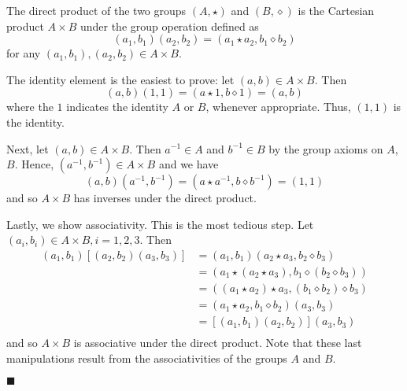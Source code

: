 \documentclass[12pt]{article}
\renewcommand{\qed}{\hfill$\blacksquare$}
\renewenvironment{proof}{\begin{addmargin}[1em]{0em}\begin{newproof}}{\end{newproof}\end{addmargin}\qed}
\begin{document}
\begin{proof}
The direct product of the two groups $\left(A,\star\right)$ and $\left(B,\diamond \right)$ is the Cartesian product $A\times B$ under the group operation defined as
$$\left(a_1,b_1\right)\left(a_2,b_2\right) = \left(a_1\star a_2, b_1\diamond b_2\right) $$
for any $\left(a_1,b_1\right),\left(a_2,b_2\right)\in A\times B$.

The identity element is the easiest to prove: let $\left(a,b\right)\in A\times B$. Then
$$ \left(a,b\right)\left(1,1\right) = \left(a\star 1, b\diamond 1\right) = \left(a,b\right) $$
where the $1$ indicates the identity $A$ or $B$, whenever appropriate. Thus, $\left(1,1\right)$ is the identity.

Next, let $\left(a,b\right)\in A\times B$. Then $a^{-1}\in A$ and $b^{-1}\in B$ by the group axioms on $A$, $B$. Hence, $\left(a^{-1},b^{-1}\right)\in A\times B$ and we have
$$ \left(a,b\right)\left(a^{-1},b^{-1}\right) = \left(a\star a^{-1},b\diamond b^{-1}\right) = \left(1,1\right) $$
and so $A\times B$ has inverses under the direct product.

Lastly, we show associativity. This is the most tedious step. Let $\left(a_i,b_i\right)\in A\times B, i=1,2,3$. Then
\begin{equation*}
    \begin{split}
        \left(a_1,b_1\right)\left[\left(a_2,b_2\right)\left(a_3,b_3\right)\right] & = \left(a_1,b_1\right)\left(a_2\star a_3, b_2\diamond b_3\right) \\
        & = \left(a_1 \star \left(a_2\star a_3\right), b_1 \diamond \left(b_2 \diamond b_3\right)\right) \\
        & = \left(\left( a_1 \star a_2\right) \star a_3, \left(b_1 \diamond b_2 \right) \diamond b_3\right) \\
        & = \left(a_1 \star a_2, b_1 \diamond b_2\right)\left(a_3,b_3\right)\\
        & = \left[\left(a_1,b_1\right)\left(a_2,b_2\right) \right]\left(a_3,b_3\right) \\
    \end{split}
\end{equation*}
and so $A\times B$ is associative under the direct product. Note that these last manipulations result from the associativities of the groups $A$ and $B$.
\end{proof}
\end{document}
